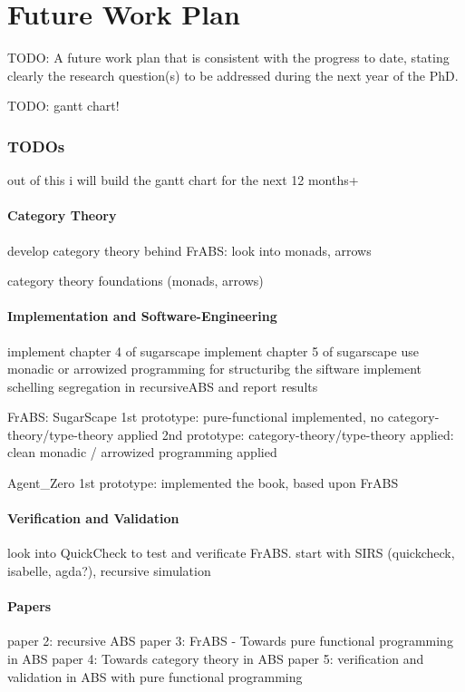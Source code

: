 \chapter{Future Work Plan}
TODO: A future work plan that is consistent with the progress to date, stating clearly the research question(s) to be addressed during the next year of the PhD.

TODO: gantt chart!

\subsection{TODOs}
out of this i will build the gantt chart for the next 12 months+

\subsubsection{Category Theory}
develop category theory behind FrABS: look into monads, arrows

category theory foundations (monads, arrows)

\subsubsection{Implementation and Software-Engineering}
implement chapter 4 of sugarscape
implement chapter 5 of sugarscape
use monadic or arrowized programming for structuribg the siftware
implement schelling segregation in recursiveABS and report results

FrABS: SugarScape
1st prototype: pure-functional implemented, no category-theory/type-theory applied
2nd prototype: category-theory/type-theory applied: clean monadic / arrowized programming applied

Agent\_Zero
1st prototype: implemented the book, based upon FrABS 

\subsubsection{Verification and Validation}
look into QuickCheck to test and verificate FrABS. start with SIRS
(quickcheck, isabelle, agda?), recursive simulation

\subsubsection{Papers}
paper 2: recursive ABS
paper 3: FrABS - Towards pure functional programming in ABS
paper 4: Towards category theory in ABS
paper 5: verification and validation in ABS with pure functional programming


